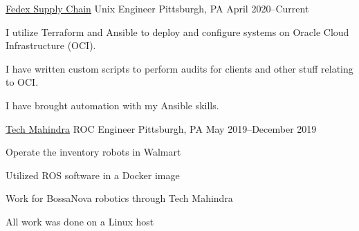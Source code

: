 


\begin{cventries}

\cventry
    {\href{www.fedex.com}{Fedex Supply Chain}}
    {Unix Engineer}
    {Pittsburgh, PA} {April 2020--Current}
    {
    \begin{cvitems}
    \item I utilize Terraform and Ansible to deploy and configure systems on Oracle Cloud Infrastructure (OCI).
    \item I have written custom scripts to perform audits for clients and other stuff relating to OCI.
    \item I have brought automation with my Ansible skills.
    \end{cvitems}
    }
\cventry
    {\href{www.techmahindra.com}{Tech Mahindra}}
    {ROC Engineer}
    {Pittsburgh, PA} {May 2019--December 2019}
    {
    \begin{cvitems}
    \item Operate the inventory robots in Walmart
    \item Utilized ROS software in a Docker image
    \item Work for BossaNova robotics through Tech Mahindra
    \item All work was done on a Linux host
    \end{cvitems}
    }


\end{cventries}
